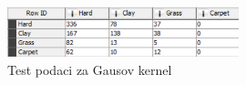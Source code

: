 \documentclass[a4paper]{article}
\begin{document}
\begin{figure}[H]
\begin{center}
	\includegraphics[width=0.6\textwidth]{Klasifikacija/SVM/rbf_test}
\end{center}
\caption{Test podaci za Gausov kernel}
\label{fig:rbf_test}
\end{figure}
\end{document}
